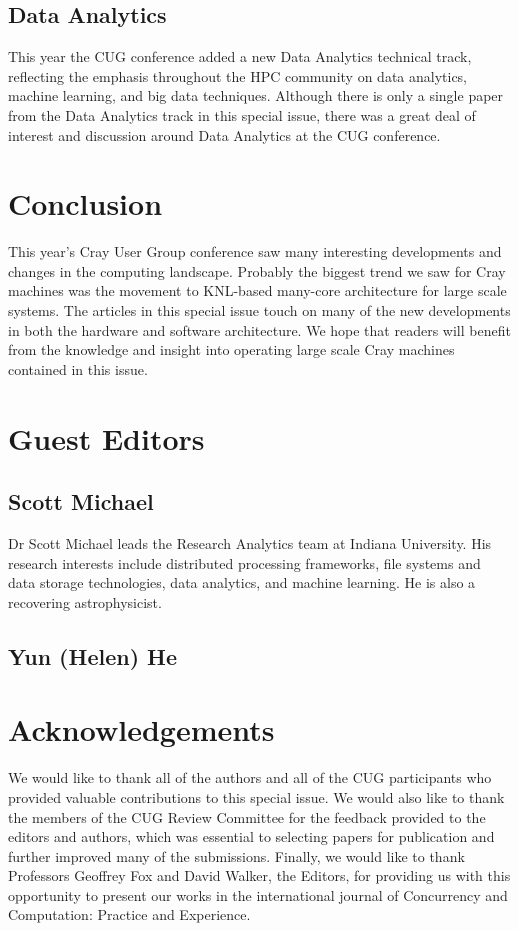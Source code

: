 \documentclass[AMA,LATO1COL,demo]{WileyNJD-v2}
\begin{document}
\subsection{Data Analytics}\label{sec:data}

This year the CUG conference added a new Data Analytics technical track, reflecting the
emphasis throughout the HPC community on data analytics, machine learning, and big data
techniques. Although there is only a single paper from the Data Analytics track in this
special issue, there was a great deal of interest and discussion around Data Analytics at
the CUG conference.

\section{Conclusion}\label{sec:conclusion}

This year's Cray User Group conference saw many interesting developments and changes in
the computing landscape. Probably the biggest trend we saw for Cray machines was the
movement to KNL-based many-core architecture for large scale systems. The articles in this
special issue touch on many of the new developments in both the hardware and software
architecture. We hope that readers will benefit from the knowledge and insight into
operating large scale Cray machines contained in this issue.

\section{Guest Editors}\label{sec:editors}
\subsection{Scott Michael}\label{sec:scott}
Dr Scott Michael leads the Research Analytics team at Indiana University. His research interests include distributed processing frameworks, file systems and data storage technologies, data analytics, and machine learning. He is also a recovering astrophysicist.
\subsection{Yun (Helen) He}\label{sec:helen}

\section{Acknowledgements}\label{sec:acknowledge}

We would like to thank all of the authors and all of the CUG participants who provided valuable contributions to this
special issue. We would also like to thank the members of the CUG Review Committee for the feedback provided to
the editors and authors, which was essential to selecting papers for publication and further improved many of the submissions. Finally, we would like to
thank Professors Geoffrey Fox and David Walker, the Editors, for
providing us with this opportunity to present our works in the international
journal of Concurrency and Computation: Practice and Experience.


\nocite{*}%

\end{document}
